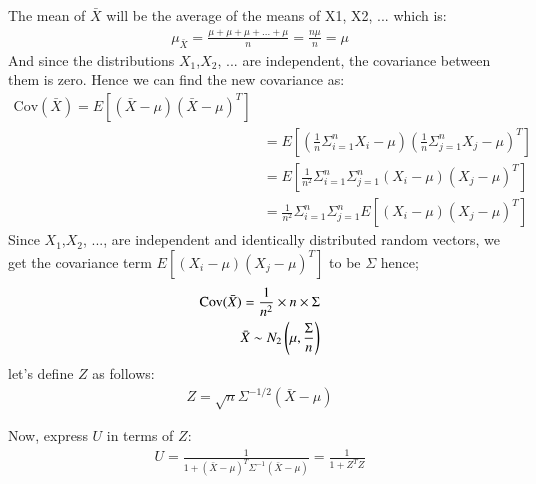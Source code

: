 \documentclass[journal,12pt,onecolumn]{IEEEtran}
\theoremstyle{remark}
\begin{document}
The mean of $\bar{X}$ will be the average of the means of X1, X2, ... which is:
\begin{align}
    \mu_{\bar{X}} =\frac{\mu + \mu + \mu + ... + \mu}{n} = \frac{n\mu}{n} = \mu   
\end{align}
And since the distributions $X_1$,$X_2$, ... are independent, the covariance between them is zero. Hence we can find 
the new covariance as:\\
\begin{align}
    \text{Cov}(\bar{X}) = E[(\bar{X}-\mu)(\bar{X}-\mu)^T]\\
     &= E[(\frac{1}{n}\Sigma_{i = 1}^{n} X_{i} - \mu)(\frac{1}{n}\Sigma_{j = 1}^{n} X_{j} - \mu)^T] \\
     &= E[\frac{1}{n^2}\Sigma_{i = 1}^{n}\Sigma_{j = 1}^{n}(X_{i} - \mu)(X_{j} - \mu)^T]\\
     &= \frac{1}{n^2}\Sigma_{i = 1}^{n}\Sigma_{j = 1}^{n}E[(X_{i} - \mu)(X_{j} - \mu)^T]
\end{align}
Since $X_1$,$X_2$, ..., are independent and identically distributed random vectors, we get the covariance term $E[(X_{i} - \mu)(X_{j} - \mu)^T]$
to be $\Sigma$
hence;
\begin{align}
    \text{Cov}(\bar{X}) = \frac{1}{n^2}\times n\times\Sigma\\
    \bar{X} \sim N_2\left(\mu,\frac{\Sigma}{n}\right)
\end{align}
let's define $Z$ as follows:
\begin{align}
     Z = \sqrt{n}\Sigma^{-1/2}(\bar{X} - \mu)
\end{align}

Now, express $U$ in terms of $Z$:
\begin{align}
    U = \frac{1}{1 + (\bar{X} - \mu)^T \Sigma^{-1} (\bar{X} - \mu)}
    = \frac{1}{1 + Z^T Z}
\end{align}
\end{document}
